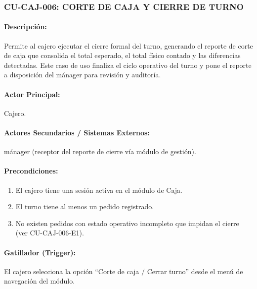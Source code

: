 \subsubsection{CU-CAJ-006: CORTE DE CAJA Y CIERRE DE TURNO}
\paragraph{Descripción:} Permite al cajero ejecutar el cierre formal del turno, generando el reporte de corte de caja que consolida el total esperado, el total físico contado y las diferencias detectadas. Este caso de uso finaliza el ciclo operativo del turno y pone el reporte a disposición del mánager para revisión y auditoría.

\paragraph{Actor Principal:} Cajero.

\paragraph{Actores Secundarios / Sistemas Externos:} mánager (receptor del reporte de cierre vía módulo de gestión).

\paragraph{Precondiciones:}
\begin{enumerate}
    \item[I.] El cajero tiene una sesión activa en el módulo de Caja.
    \item[II.] El turno tiene al menos un pedido registrado.
    \item[III.] No existen pedidos con estado operativo incompleto que impidan el cierre (ver CU-CAJ-006-E1).
\end{enumerate}

\paragraph{Gatillador (Trigger):} El cajero selecciona la opción ``Corte de caja / Cerrar turno'' desde el menú de navegación del módulo.

